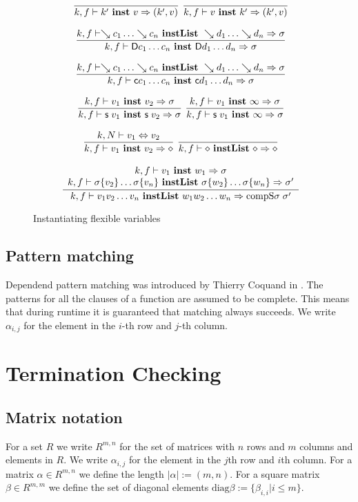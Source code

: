 \begin{figure}
\begin{gather*}
\nru{}
{}
{\inst{k}{f}{k'}{v}{(k',v)}}
%
\nru{}
{}
{\inst{k}{f}{v}{k'}{(k',v)}}
%
\\[2ex]
\nru{}
{{\instlist{k}{f}{\wh{c_1} \ldots \wh{c_n}}{\wh{d_1} \ldots \wh{d_n}}{\sigma}}}
{\inst{k}{f}{\DD c_1 \ldots c_n}{\DD d_1 \ldots d_n}{\sigma}
}
\\[2ex]
\nru{}
{{\instlist{k}{f}{\wh{c_1} \ldots \wh{c_n}}{\wh{d_1} \ldots \wh{d_n}}{\sigma}}}
{\inst{k}{f}{\cc c_1 \ldots c_n}{\cc d_1 \ldots d_n}{\sigma}
}
\\[2ex]
\nru{}
{\inst{k}{f}{v_1}{v_2}{\sigma}}
{\inst{k}{f}{\s v_1}{\s v_2}{\sigma}
}
\nru{}
{\inst{k}{f}{v_1}{\infty}{\sigma}}
{\inst{k}{f}{\s v_1}{\infty}{\sigma}
}
\\[2ex]
\nru{}
{\EqVal{k}{N}{v_1}{v_2}}
{\inst{k}{f}{v_1}{v_2}{\diamond}
}
\nru{}
{}
{\instlist{k}{f}{\diamond}{\diamond}{\diamond}}
\\[2ex]
\ndru{}
{\inst{k}{f}{v_1}{w_1}{\sigma}}
{\instlist{k}{f}{\subst{\sigma}{v_2} \ldots \subst{\sigma}{v_n}}{\subst{\sigma}{w_2} \ldots \subst{\sigma}{w_n}}{\sigma'}}
{\instlist{k}{f}{v_1 v_2 \ldots v_n}{w_1 w_2 \ldots w_n}{\compS \sigma \sigma'}}
\end{gather*}
\caption{Instantiating flexible variables}
\end{figure}

\section{Pattern matching}
Dependend pattern matching was introduced by Thierry Coquand in \cite{coquand92pattern}.
The patterns for all the clauses of a function are assumed to be complete. This means that during runtime
it is guaranteed that matching always succeeds.
We write $\alpha_{i,j}$ for the element in the $i$-th row and $j$-th column.

\chapter{Termination Checking}

\section{Matrix notation}

\newcommand{\diag}{\mathrm{diag}}

For a set $R$ we write $R^{m,n}$ for the set of matrices with $n$ rows and $m$ columns and elements in $R$.
We write $\alpha_{i,j}$ for the element in the $j$th row and $i$th column.
For a matrix $\alpha \in R^{m,n}$ we define the length $|\alpha| := (m,n)$.
For a square matrix $\beta \in R^{m,m}$ we define the set of diagonal elements $\diag \beta := \{ \beta_{i,i} \vert i \leq m\}$.

